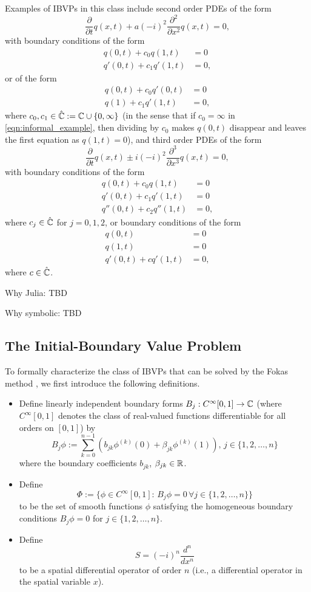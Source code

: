 \documentclass[11pt, oneside, a4paper]{article}
\begin{document}
\noindent Examples of IBVPs in this class include second order PDEs of the form
\[\frac{\partial}{\partial t} q(x,t) + a(-i)^2 \frac{\partial^2}{\partial x^2} q(x,t) = 0,\]
with boundary conditions of the form
\begin{equation}\label{eqn:informal_example}
    \begin{split}
    q(0,t) + c_0q(1,t) &= 0\\
    q'(0,t) + c_1q'(1,t) &= 0,
    \end{split}
\end{equation}
or of the form
\begin{align*}
    q(0,t) + c_0 q'(0,t) &= 0\\
    q(1) + c_1 q'(1,t) &= 0,
\end{align*}
where $c_0, c_1\in\hat{\mathbb C}:=\mathbb C\cup\{0,\infty\}$ (in the sense that if $c_0=\infty$ in \ref{eqn:informal_example}, then dividing by $c_0$ makes $q(0,t)$ disappear and leaves the first equation as $q(1,t) = 0$), and third order PDEs of the form 
\[\frac{\partial}{\partial t} q(x,t) \pm i(-i)^2 \frac{\partial^3}{\partial x^3} q(x,t) = 0,\]
with boundary conditions of the form
\begin{align*}
    q(0,t) + c_0 q(1,t) &= 0\\
    q'(0,t) + c_1 q'(1,t) &= 0\\
    q''(0,t) + c_2 q''(1,t) &= 0,
\end{align*}
where $c_j\in\hat{\mathbb C}$ for $j=0,1,2$, or boundary conditions of the form 
\begin{align*}
    q(0,t) &= 0\\
    q(1,t) &= 0\\
    q'(0,t) + c q'(1,t) &= 0,
\end{align*}
where $c\in\hat{\mathbb C}$.

Why Julia: TBD

Why symbolic: TBD

\subsection{The Initial-Boundary Value Problem}
To formally characterize the class of IBVPs that can be solved by the Fokas method \cite[p.9]{Smith2016}, we first introduce the following definitions.
\begin{itemize}
    \item Define linearly independent boundary forms $B_j: C^\infty[0,1]\to \mathbb C$ (where $C^\infty[0,1]$ denotes the class of real-valued functions differentiable for all orders on $[0,1]$) by
    \[B_j\phi := \sum_{k=0}^{n-1}\left(b_{jk}\phi^{(k)}(0) + \beta_{jk}\phi^{(k)}(1)\right),\, j\in\{1,2,\ldots,n\}\]
    where the boundary coefficients $b_{jk}$, $\beta_{jk}\in\mathbb R$. 
    \item Define
    \[\Phi:=\{\phi\in C^\infty[0,1]:\, B_j\phi = 0\,\forall j\in\{1,2,\ldots,n\}\}\]
    to be the set of smooth functions $\phi$ satisfying the homogeneous boundary conditions $B_j\phi=0$ for $j\in\{1,2,\ldots,n\}$.
    \item Define 
    \[S = (-i)^n \frac{d^n}{dx^n}\]
    to be a spatial differential operator of order $n$ (i.e., a differential operator in the spatial variable $x$).
\end{itemize}
\end{document}
